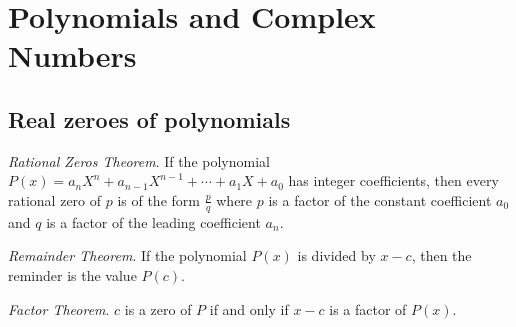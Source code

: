 \documentclass{report}
\begin{document}
    \tableofcontents

    \pagebreak
    \chapter{ Polynomials and Complex Numbers}
        \section{Real zeroes of polynomials}
            \begin{thBox}
                \textit{Rational Zeros Theorem}. If the polynomial $P(x) = a_nX^n + a_{n-1}X^{n-1} + \cdots + a_1X + a_0$ has integer coefficients, then every rational zero of $p$ is of the form $\frac{p}{q}$ where $p$ is a factor of the constant coefficient $a_0$ and $q$ is a factor of the leading coefficient $a_n$.
            \end{thBox}
            \begin{thBox}
                \textit{Remainder Theorem}. If the polynomial $P(x)$ is divided by $x - c$, then the reminder is the value $P(c)$.
            \end{thBox}
            \begin{thBox}
                \textit{Factor Theorem}. $c$ is a zero of $P$ if and only if $x-c$ is a factor of $P(x)$.
            \end{thBox}
\end{document}
